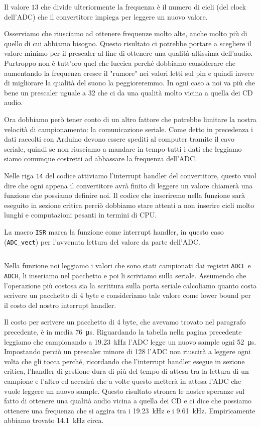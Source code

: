 \documentclass[a4paper,11pt]{article}
\newcommand\source[2]{
	\inputminted[fontsize=\footnotesize,linenos=true,tabsize=4]{#1}{#2}
}
\begin{document}
Il valore $13$ che divide ulteriormente la frequenza è il numero di cicli (del clock dell'ADC) che il convertitore impiega per leggere un nuovo valore.

Osserviamo che riusciamo ad ottenere frequenze molto alte, anche molto più di quello di cui abbiamo bisogno. Questo risultato ci potrebbe portare a scegliere il valore minimo per il prescaler al fine di ottenere una qualità altissima dell'audio. Purtroppo non è tutt'oro quel che luccica perché dobbiamo considerare che aumentando la frequenza cresce il "rumore" nei valori letti sul pin e quindi invece di migliorare la qualità del suono la peggioreremmo. In ogni caso a noi va più che bene un prescaler uguale a 32 che ci da una qualità molto vicina a quella dei CD audio.

Ora dobbiamo però tener conto di un altro fattore che potrebbe limitare la nostra velocità di campionamento: la comunicazione seriale.
Come detto in precedenza i dati raccolti con Arduino devono essere spediti al computer tramite il cavo seriale, quindi se non riusciamo a mandare in tempo tutti i dati che leggiamo siamo comunque costretti ad abbassare la frequenza dell'ADC.

Nelle riga \texttt{14} del codice attiviamo l'interrupt handler del convertitore, questo vuol dire che ogni appena il convertitore avrà finito di leggere un valore chiamerà una funzione che possiamo definire noi. Il codice che inseriremo nella funzione sarà eseguito in sezione critica perciò dobbiamo stare attenti a non inserire cicli molto lunghi e computazioni pesanti in termini di CPU.

La macro \texttt{ISR} marca la funzione come interrupt handler, in questo caso (\texttt{ADC\_vect}) per l'avvenuta lettura del valore da parte dell'ADC.

\source{cpp}{adc_interrupt_rel}

Nella funzione noi leggiamo i valori che sono stati campionati dai registri \texttt{ADCL} e \texttt{ADCH}, li inseriamo nel pacchetto e poi li scriviamo sulla seriale. Assumendo che l'operazione più costosa sia la scrittura sulla porta seriale calcoliamo quanto costa scrivere un pacchetto di 4 byte e consideriamo tale valore come lower bound per il costo del nostro interrupt handler.

Il costo per scrivere un pacchetto di 4 byte, che avevamo trovato nel paragrafo precedente, è in media \SI{76}{\micro\second}. Riguardando la tabella nella pagina precedente leggiamo che campionando a \SI{19.23}{\kilo\hertz} l'ADC legge un nuovo sample ogni \SI{52}{\micro\second}. Impostando perciò un prescaler minore di 128 l'ADC non riuscirà a leggere ogni volta che gli tocca perché, ricordando che l'interrupt handler esegue in sezione critica, l'handler di gestione dura di più del tempo di attesa tra la lettura di un campione e l'altro ed accadrà che a volte questo metterà in attesa l'ADC che vuole leggere un nuovo sample.
Questo risultato stronca le nostre speranze sul fatto di ottenere una qualità audio vicina a quella dei CD e ci dice che possiamo ottenere una frequenza che si aggira tra i \SI{19.23}{\kilo\hertz} e i \SI{9.61}{\kilo\hertz}. Empiricamente abbiamo trovato \SI{14.1}{\kilo\hertz} circa.
\end{document}
